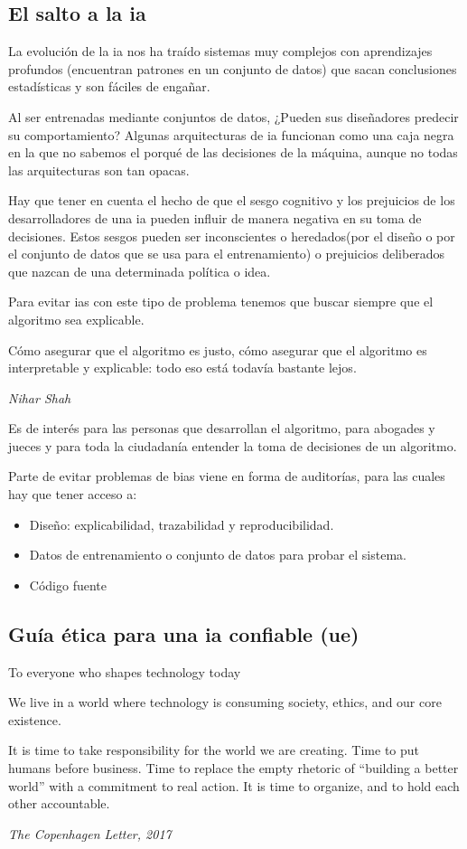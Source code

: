 \subsection{El salto a la \gls{ia}}

La evolución de la \gls{ia} nos ha traído sistemas muy complejos con aprendizajes profundos (encuentran patrones en un conjunto de datos) que sacan conclusiones estadísticas y son fáciles de engañar.

Al ser entrenadas mediante conjuntos de datos, ¿Pueden sus diseñadores predecir su comportamiento?  Algunas arquitecturas de \gls{ia} funcionan como una caja negra en la que no sabemos el porqué de las decisiones de la máquina, aunque no todas las arquitecturas son tan opacas.

Hay que tener en cuenta el hecho de que el sesgo cognitivo y los prejuicios de los desarrolladores de una \gls{ia} pueden influir de manera negativa en su toma de decisiones.
Estos sesgos pueden ser inconscientes o heredados(por el diseño o por el conjunto de datos que se usa para el entrenamiento) o prejuicios deliberados que nazcan de una determinada política o idea.

Para evitar \gls{ia}s con este tipo de problema tenemos que buscar siempre que el algoritmo sea explicable.

\epigraph{Cómo asegurar que el algoritmo es justo, cómo asegurar que el algoritmo es interpretable y explicable: todo eso está todavía bastante lejos.}{\textit{Nihar Shah}}

Es de interés para las personas que desarrollan el algoritmo, para abogades y jueces y para toda la ciudadanía entender la toma de decisiones de un algoritmo.

Parte de evitar problemas de bias viene en forma de auditorías, para las cuales hay que tener acceso a:
\begin{itemize}
    \item Diseño: explicabilidad, trazabilidad y reproducibilidad.
    \item Datos de entrenamiento o conjunto de datos para probar el sistema.
    \item Código fuente
\end{itemize}

\subsection{Guía ética para una \gls{ia} confiable (\gls{ue})}

\epigraph{To everyone who shapes technology today

    We live in a world where technology is consuming society, ethics, and our core existence.

    It is time to take responsibility for the world we are creating. Time to put humans before business. Time to replace the empty rhetoric of “building a better world” with a commitment to real action. It is time to organize, and to hold each other accountable.
}{\textit{The Copenhagen Letter, 2017}}

